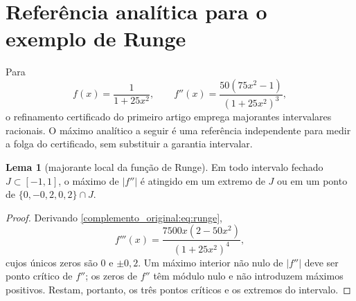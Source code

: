 \documentclass[12pt,a4paper]{article}
\theoremstyle{preciso}
\theoremstyle{definition}
\theoremstyle{preciso}
\theoremstyle{preciso}
\newtheorem{lemma}[teorema]{Lema}
\theoremstyle{preciso}
\theoremstyle{preciso}
\theoremstyle{definition}
\theoremstyle{preciso}
\theoremstyle{definition}
\theoremstyle{preciso}
\theoremstyle{preciso}
\theoremstyle{definition}
\begin{document}
\setcounter{section}{20}
\clearpage\section{Referência analítica para o exemplo de Runge}
Para
\begin{equation}
 f(x)=\frac{1}{1+25x^2},\qquad
 f''(x)=\frac{50(75x^2-1)}{(1+25x^2)^3},
 \label{complemento_original:eq:runge}
\end{equation}
o refinamento certificado do primeiro artigo emprega majorantes intervalares racionais. O máximo analítico a seguir é uma referência independente para medir a folga do certificado, sem substituir a garantia intervalar.

\begin{lemma}[majorante local da função de Runge]\label{map:complemento_original:21.1}\label{complemento_original:lem:runge-majorant}
Em todo intervalo fechado $J\subset[-1,1]$, o máximo de $|f''|$ é atingido em um extremo de $J$ ou em um ponto de $\{0,-0{,}2,0{,}2\}\cap J$.
\end{lemma}

\begin{proof}
Derivando \eqref{complemento_original:eq:runge},
\[
 f'''(x)=\frac{7500x(2-50x^2)}{(1+25x^2)^4},
\]
cujos únicos zeros são $0$ e $\pm0{,}2$. Um máximo interior não nulo de $|f''|$ deve ser ponto crítico de $f''$; os zeros de $f''$ têm módulo nulo e não introduzem máximos positivos. Restam, portanto, os três pontos críticos e os extremos do intervalo.
\end{proof}
\end{document}
